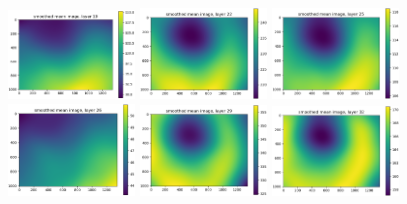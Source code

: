 \documentclass[letterpaper,11pt]{article}
\begin{document}
\begin{figure}[!ht]
\includegraphics[width=0.3\textwidth]{images/results/smoothed_mean_image_layers_vectra/smoothed_mean_image_layer_19}
\includegraphics[width=0.3\textwidth]{images/results/smoothed_mean_image_layers_vectra/smoothed_mean_image_layer_22}
\includegraphics[width=0.3\textwidth]{images/results/smoothed_mean_image_layers_vectra/smoothed_mean_image_layer_25}
\includegraphics[width=0.3\textwidth]{images/results/smoothed_mean_image_layers_vectra/smoothed_mean_image_layer_26}
\includegraphics[width=0.3\textwidth]{images/results/smoothed_mean_image_layers_vectra/smoothed_mean_image_layer_29}
\includegraphics[width=0.3\textwidth]{images/results/smoothed_mean_image_layers_vectra/smoothed_mean_image_layer_32}

\end{figure}
\end{document}
